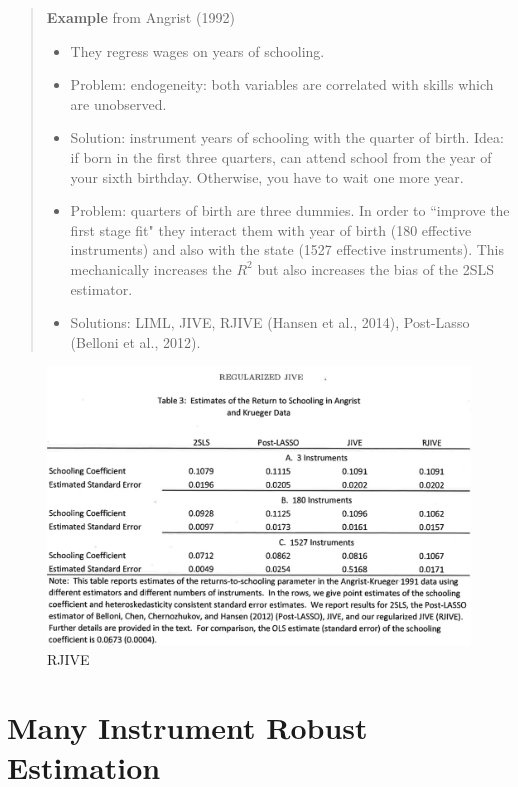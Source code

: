 \documentclass[12pt,]{book}
\providecommand{\tightlist}{%
  \setlength{\itemsep}{0pt}\setlength{\parskip}{0pt}}
\begin{document}
\begin{quote}
\textbf{Example} from Angrist (1992)

\begin{itemize}
\tightlist
\item
  They regress wages on years of schooling.
\item
  Problem: endogeneity: both variables are correlated with skills which are unobserved.
\item
  Solution: instrument years of schooling with the quarter of birth. Idea: if born in the first three quarters, can attend school from the year of your sixth birthday. Otherwise, you have to wait one more year.
\item
  Problem: quarters of birth are three dummies. In order to ``improve the first stage fit" they interact them with year of birth (180 effective instruments) and also with the state (1527 effective instruments). This mechanically increases the \(R^2\) but also increases the bias of the 2SLS estimator.
\item
  Solutions: LIML, JIVE, RJIVE (Hansen et al., 2014), Post-Lasso (Belloni et al., 2012).
\end{itemize}
\end{quote}

\begin{figure}
\centering
\includegraphics{figures/Fig_441.png}
\caption{RJIVE}
\end{figure}

\hypertarget{many-instrument-robust-estimation}{%
\section{Many Instrument Robust Estimation}\label{many-instrument-robust-estimation}}
\end{document}

